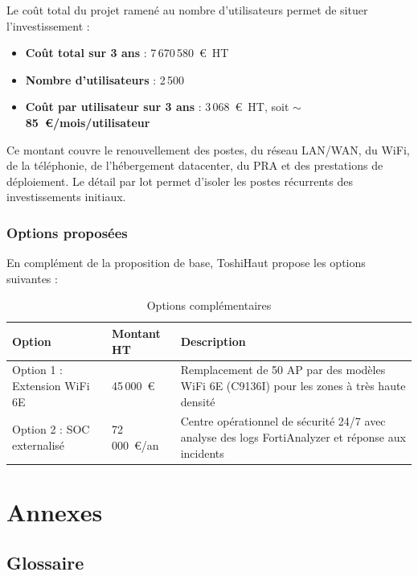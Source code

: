 \documentclass[12pt,a4paper]{report}
\begin{document}
Le coût total du projet ramené au nombre d'utilisateurs permet de situer l'investissement :

\begin{itemize}
\item \textbf{Coût total sur 3 ans} : 7\,670\,580~\euro{}~HT
\item \textbf{Nombre d'utilisateurs} : 2\,500
\item \textbf{Coût par utilisateur sur 3 ans} : 3\,068~\euro{}~HT, soit \textbf{$\sim$85~\euro{}/mois/utilisateur}
\end{itemize}

Ce montant couvre le renouvellement des postes, du réseau LAN/WAN, du WiFi, de la téléphonie, de l'hébergement datacenter, du PRA et des prestations de déploiement. Le détail par lot permet d'isoler les postes récurrents des investissements initiaux.

\subsection{Options proposées}

En complément de la proposition de base, ToshiHaut propose les options suivantes :

\begin{table}[H]
\centering
\begin{tabularx}{\textwidth}{L{6cm}R{2.5cm}L{4.5cm}}
\toprule
\textbf{Option} & \textbf{Montant HT} & \textbf{Description} \\
\midrule
Option 1 : Extension WiFi 6E & 45\,000~\euro{} & Remplacement de 50 AP par des modèles WiFi 6E (C9136I) pour les zones à très haute densité \\
\addlinespace
Option 2 : SOC externalisé & 72\,000~\euro{}/an & Centre opérationnel de sécurité 24/7 avec analyse des logs FortiAnalyzer et réponse aux incidents \\
\bottomrule
\end{tabularx}
\caption{Options complémentaires}
\label{tab:options}
\end{table}


\appendix
\chapter{Annexes}

\section{Glossaire}
\end{document}
